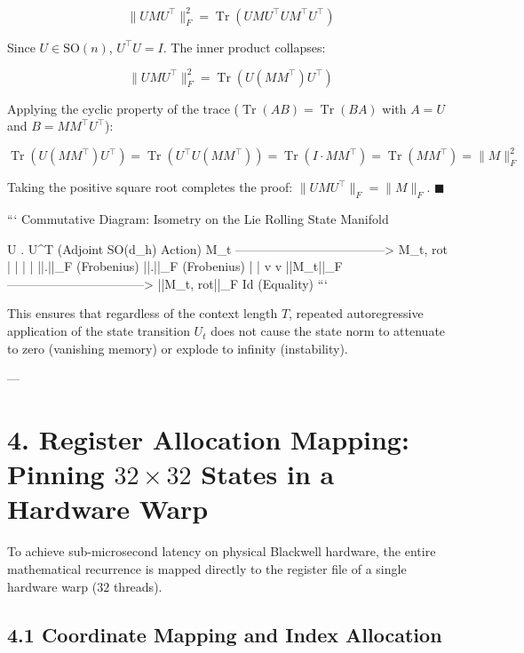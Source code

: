 \documentclass[11pt,twoside,openright]{amsbook}
\begin{document}
{{{{{{{$$\|U M U^\top\|_F^2 = \operatorname{Tr}\left( U M U^\top U M^\top U^\top \right)$$

Since $U \in \mathrm{SO}(n)$, $U^\top U = I$. The inner product collapses:

$$\|U M U^\top\|_F^2 = \operatorname{Tr}\left( U (M M^\top) U^\top \right)$$

Applying the cyclic property of the trace ($\operatorname{Tr}(A B) = \operatorname{Tr}(B A)$ with $A = U$ and $B = M M^\top U^\top$):

$$\operatorname{Tr}\left( U (M M^\top) U^\top \right) = \operatorname{Tr}\left( U^\top U (M M^\top) \right) = \operatorname{Tr}\left( I \cdot M M^\top \right) = \operatorname{Tr}(M M^\top) = \|M\|_F^2$$

Taking the positive square root completes the proof: $\|U M U^\top\|_F = \|M\|_F$. $\blacksquare$

```
Commutative Diagram: Isometry on the Lie Rolling State Manifold

                U . U^T (Adjoint SO(d_h) Action)
      M_t ------------------------------------> M_{t, rot}
       |                                           |
       |                                           |
  ||.||_F (Frobenius)                         ||.||_F (Frobenius)
       |                                           |
       v                                           v
    ||M_t||_F ---------------------------------> ||M_{t, rot}||_F
                             Id (Equality)
```

This ensures that regardless of the context length $T$, repeated autoregressive application of the state transition $U_t$ does not cause the state norm to attenuate to zero (vanishing memory) or explode to infinity (instability).

---

\section{4. Register Allocation Mapping: Pinning $32 \times 32$ States in a Hardware Warp}

To achieve sub-microsecond latency on physical Blackwell hardware, the entire mathematical recurrence is mapped directly to the register file of a single hardware warp ($32$ threads).

\subsection{4.1 Coordinate Mapping and Index Allocation}

}}}}}}}
\end{document}

